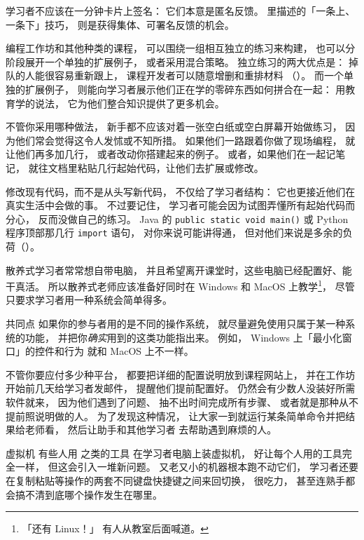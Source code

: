 学习者不应该在一分钟卡片上签名：
它们本意是匿名反馈。
里描述的「一条上、一条下」技巧，
则是获得集体、可署名反馈的机会。


编程工作坊和其他种类的课程，
可以围绕一组相互独立的练习来构建，
也可以分阶段展开一个单独的扩展例子，
或者采用混合策略。
独立练习的两大优点是：
掉队的人能很容易重新跟上，
课程开发者可以随意增删和重排材料
（）。
而一个单独的扩展例子，
则能向学习者展示他们正在学的零碎东西如何拼合在一起：
用教育学的说法，
它为他们整合知识提供了更多机会。

不管你采用哪种做法，
新手都不应该对着一张空白纸或空白屏幕开始做练习，
因为他们常会觉得这令人发怵或不知所措。
如果他们一路跟着你做了现场编程，
就让他们再多加几行，
或者改动你搭建起来的例子。
或者，如果他们在一起记笔记，
就往文档里粘贴几行起始代码，让他们去扩展或修改。

修改现有代码，而不是从头写新代码，
不仅给了学习者结构：
它也更接近他们在真实生活中会做的事。
不过要记住，
学习者可能会因为试图弄懂所有起始代码而分心，
反而没做自己的练习。
Java 的 \texttt{public static void main()}
或 Python 程序顶部那几行 \texttt{import} 语句，
对你来说可能讲得通，
但对他们来说是多余的负荷（）。


散养式学习者常常想自带电脑，
并且希望离开课堂时，这些电脑已经配置好、能干真活。
所以散养式老师应该准备好同时在 Windows 和 MacOS 上教学\footnote{「还有 Linux！」
有人从教室后面喊道。}，
尽管只要求学习者用一种系统会简单得多。

\begin{aside}{共同点}
  如果你的参与者用的是不同的操作系统，
  就尽量避免使用只属于某一种系统的功能，
  并把你\emph{确实}用到的这类功能指出来。
  例如，
  Windows 上「最小化窗口」的控件和行为
  就和 MacOS 上不一样。
\end{aside}

不管你要应付多少种平台，
都要把详细的配置说明放到课程网站上，
并在工作坊开始前几天给学习者发邮件，
提醒他们提前配置好。
仍然会有少数人没装好所需软件就来，
因为他们遇到了问题、
抽不出时间完成所有步骤、
或者就是那种从不提前照说明做的人。
为了发现这种情况，
让大家一到就运行某条简单命令并把结果给老师看，
然后让助手和其他学习者
去帮助遇到麻烦的人。

\begin{aside}{虚拟机}
  有些人用  之类的工具
  在学习者电脑上装虚拟机，
  好让每个人用的工具完全一样，
  但这会引入一堆新问题。
  又老又小的机器根本跑不动它们，
  学习者还要在复制粘贴等操作的两套不同键盘快捷键之间来回切换，
  很吃力，
  甚至连熟手都会搞不清到底哪个操作发生在哪里。
\end{aside}

